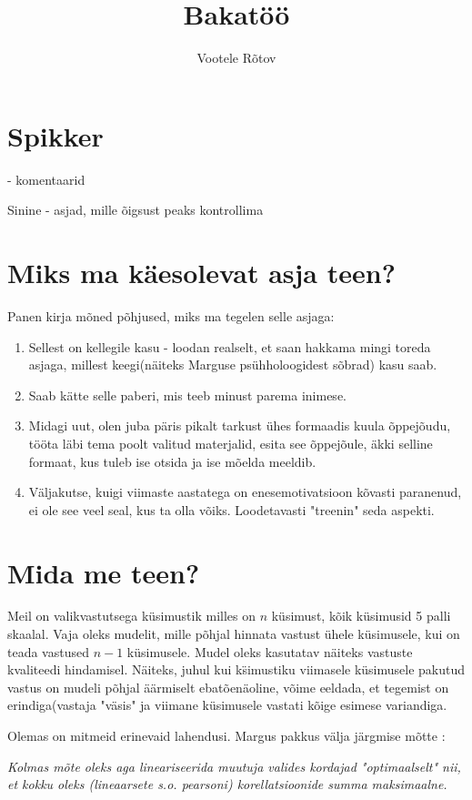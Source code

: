 \documentclass{article}
\author{Vootele Rõtov}
\title{Bakatöö}
\begin{document}
\section*{Spikker}

{\color{cyan} - komentaarid}

{\color{blue}Sinine - asjad, mille õigsust peaks kontrollima}


{\color{cyan}\section*{Miks ma käesolevat asja teen?}

Panen kirja mõned põhjused, miks ma tegelen selle asjaga:
\begin{enumerate}[I]
\item Sellest on kellegile kasu - loodan realselt, et saan hakkama mingi toreda asjaga, millest keegi(näiteks Marguse psühholoogidest sõbrad) kasu saab.
\item Saab kätte selle paberi, mis teeb minust parema inimese. 
\item Midagi uut, olen juba päris pikalt tarkust ühes formaadis kuula õppejõudu, tööta läbi tema poolt valitud materjalid, esita see õppejõule, äkki selline formaat, kus tuleb ise otsida ja ise mõelda meeldib.
\item Väljakutse, kuigi viimaste aastatega on enesemotivatsioon kõvasti paranenud, ei ole see veel seal, kus ta olla võiks. Loodetavasti "treenin" seda aspekti.
\end{enumerate}}

\section*{Mida me teen?}

Meil on valikvastutsega küsimustik milles on $n$ küsimust, kõik küsimusid 5 palli skaalal. Vaja oleks mudelit, mille põhjal hinnata vastust \"uhele k\"usimusele, kui on teada vastused $n-1$ küsimusele. {\color{blue} Mudel oleks kasutatav näiteks vastuste kvaliteedi hindamisel. Näiteks, juhul kui k\"simustiku viimasele k\"usimusele pakutud vastus on mudeli põhjal äärmiselt ebatõenäoline, võime eeldada, et tegemist on erindiga(vastaja "väsis" ja viimane k\"usimusele vastati kõige esimese variandiga.} 

Olemas on mitmeid erinevaid lahendusi. Margus pakkus välja järgmise mõtte : 

\textit{Kolmas mõte oleks aga lineariseerida muutuja valides kordajad "optimaalselt" nii, et kokku oleks (lineaarsete s.o. pearsoni) korellatsioonide summa maksimaalne.}
\end{document}
